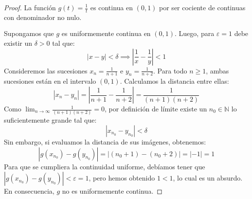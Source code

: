 \documentclass{article}
\theoremstyle{plain}
\theoremstyle{definition}
\begin{document}
\begin{proof}
    \vspace{0.3cm}
    La función \( g(t) = \frac{1}{t} \) es continua en \( (0, 1) \) por ser cociente de continuas con denominador no nulo.

    Supongamos que \( g \) es uniformemente continua en \( (0,1) \). Luego, para \( \varepsilon = 1 \) debe existir un \( \delta > 0 \) tal que:
    \[
        |x - y| < \delta \implies \left| \frac{1}{x} - \frac{1}{y} \right| < 1
    \]
    Consideremos las sucesiones \( x_n = \frac{1}{n+1} \) e \( y_n = \frac{1}{n+2} \). Para todo \( n \ge 1 \), ambas sucesiones están en el intervalo \( (0, 1) \). Calculamos la distancia entre ellas:
    \[
        |x_n - y_n| = \left| \frac{1}{n+1} - \frac{1}{n+2} \right| = \frac{1}{(n+1)(n+2)}
    \]
    Como \( \lim_{n \to \infty} \frac{1}{(n+1)(n+2)} = 0 \), por definición de límite existe un \( n_0 \in \mathbb{N} \) lo suficientemente grande tal que:
    \[
        |x_{n_0} - y_{n_0}| < \delta
    \]
    Sin embargo, si evaluamos la distancia de sus imágenes, obtenemos:
    \[
        |g(x_{n_0}) - g(y_{n_0})| = | (n_0+1) - (n_0+2) | = |-1| = 1
    \]
    Para que se cumpliera la continuidad uniforme, debíamos tener que \( |g(x_{n_0}) - g(y_{n_0})| < \varepsilon = 1 \), pero hemos obtenido \( 1 < 1 \), lo cual es un absurdo. En consecuencia, \( g \) no es uniformemente continua.
\end{proof}
\end{document}
